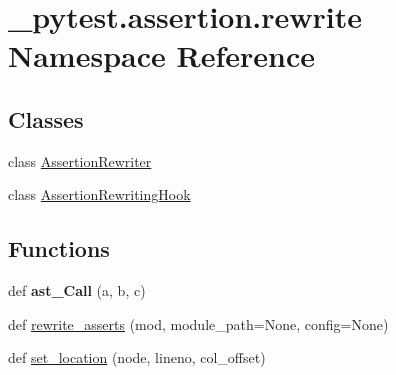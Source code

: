 \hypertarget{namespace__pytest_1_1assertion_1_1rewrite}{}\section{\+\_\+pytest.\+assertion.\+rewrite Namespace Reference}
\label{namespace__pytest_1_1assertion_1_1rewrite}
\subsection*{Classes}
\begin{DoxyCompactItemize}
\item 
class \hyperlink{class__pytest_1_1assertion_1_1rewrite_1_1_assertion_rewriter}{Assertion\+Rewriter}
\item 
class \hyperlink{class__pytest_1_1assertion_1_1rewrite_1_1_assertion_rewriting_hook}{Assertion\+Rewriting\+Hook}
\end{DoxyCompactItemize}
\subsection*{Functions}
\begin{DoxyCompactItemize}
\item 
\mbox{\label{namespace__pytest_1_1assertion_1_1rewrite_aa4b7cd416287ea663be7162a4f606cc4}} 
def {\bfseries ast\+\_\+\+Call} (a, b, c)
\item 
def \hyperlink{namespace__pytest_1_1assertion_1_1rewrite_a696d660a16415be774be90c6e9ef1bf4}{rewrite\+\_\+asserts} (mod, module\+\_\+path=None, config=None)
\item 
def \hyperlink{namespace__pytest_1_1assertion_1_1rewrite_a1c8350026dcdb06c53ce94b0eb8f060e}{set\+\_\+location} (node, lineno, col\+\_\+offset)
\end{DoxyCompactItemize}
